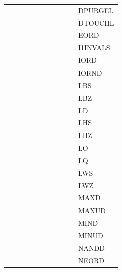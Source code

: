 {\begin{tabular}{|l|l|l|l|l|l|l|l|l|l|l|}
 & & & & & & & & & & \textsf{DPURGEL} \\
 & & & & & & & & & & \textsf{DTOUCHL} \\
 & & & & & & & & & & \textsf{EORD} \\
 & & & & & & & & & & \textsf{I1INVALS} \\
 & & & & & & & & & & \textsf{IORD} \\
 & & & & & & & & & & \textsf{IORND} \\
 & & & & & & & & & & \textsf{LBS} \\
 & & & & & & & & & & \textsf{LBZ} \\
 & & & & & & & & & & \textsf{LD} \\
 & & & & & & & & & & \textsf{LHS} \\
 & & & & & & & & & & \textsf{LHZ} \\
 & & & & & & & & & & \textsf{LO} \\
 & & & & & & & & & & \textsf{LQ} \\
 & & & & & & & & & & \textsf{LWS} \\
 & & & & & & & & & & \textsf{LWZ} \\
 & & & & & & & & & & \textsf{MAXD} \\
 & & & & & & & & & & \textsf{MAXUD} \\
 & & & & & & & & & & \textsf{MIND} \\
 & & & & & & & & & & \textsf{MINUD} \\
 & & & & & & & & & & \textsf{NANDD} \\
 & & & & & & & & & & \textsf{NEORD} \\
\hline\end{tabular}
}
\smallskip

